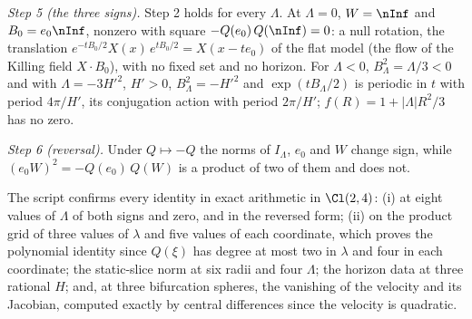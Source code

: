 \emph{Step 5 (the three signs).} Step 2 holds for every $\Lambda$. At $\Lambda = 0$, $W = \nInf$ and $B_{0} = e_{0}\nInf$, nonzero with square $-Q(e_{0})\,Q(\nInf) = 0$: a null rotation, the translation $e^{-tB_{0}/2}X(x)\,e^{tB_{0}/2} = X(x - te_{0})$ of the flat model (the flow of the Killing field $X \cdot B_{0}$), with no fixed set and no horizon. For $\Lambda < 0$, $B_{\Lambda}^{2} = \Lambda/3 < 0$ and with $\Lambda = -3H'^{2}$, $H' > 0$, $B_{\Lambda}^{2} = -H'^{2}$ and $\exp(tB_{\Lambda}/2)$ is periodic in $t$ with period $4\pi/H'$, its conjugation action with period $2\pi/H'$; $f(R) = 1 + |\Lambda|R^{2}/3$ has no zero.

\emph{Step 6 (reversal).} Under $Q \mapsto -Q$ the norms of $I_{\Lambda}$, $e_{0}$ and $W$ change sign, while $(e_{0}W)^{2} = -Q(e_{0})\,Q(W)$ is a product of two of them and does not.

The script  confirms every identity in exact arithmetic in $\Cl(2,4)$: (i) at eight values of $\Lambda$ of both signs and zero, and in the reversed form; (ii) on the product grid of three values of $\lambda$ and five values of each coordinate, which proves the polynomial identity since $Q(\xi)$ has degree at most two in $\lambda$ and four in each coordinate; the static-slice norm at six radii and four $\Lambda$; the horizon data at three rational $H$; and, at three bifurcation spheres, the vanishing of the velocity and its Jacobian, computed exactly by central differences since the velocity is quadratic.
